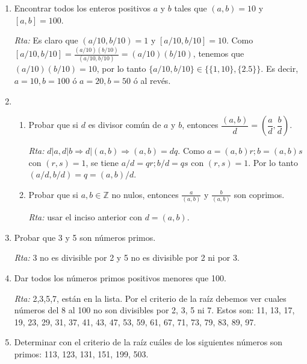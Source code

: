 \documentclass[a4paper,12pt,twoside,spanish,reqno]{amsbook}
\numberwithin{equation}{section}
\newcommand{\rta}{\noindent\textit{Rta: }}
\begin{document}
\begin{enumerate}
\begin{enumerate}
\end{enumerate}





\item Encontrar todos los enteros positivos $a$ y $b$ tales que $(a,b)=10$ y $[a,b]=100$.

\rta Es claro que $(a/10,b/10)=1$ y $[a/10,b/10] = 10$. Como $[a/10,b/10] = \displaystyle\frac{(a/10)(b/10)}{(a/10,b/10)}= (a/10)(b/10)$,  tenemos que $(a/10)(b/10) = 10$, por lo tanto $\{a/10,b/10\}\in \{\{1,10\},\{2.5\}\}$. Es decir, $a=10, b=100$ ó $a=20, b=50$ ó al revés.





\item
\begin{enumerate}
    \item Probar que si $d$ es divisor común de $a$ y $b$, entonces $\dfrac{(a,b)}{d} = \left(\dfrac{a}{d}, \dfrac{b}{d}\right)$.
    
     \rta  $d\vert a, d\vert b\Rightarrow d\vert(a,b)\Rightarrow (a,b)=dq$. Como $a=(a,b)r; b=(a, b)s$ con $(r, s)=1$, se tiene $a/d=qr; b/d=qs$ con $(r, s)=1$. Por lo tanto $(a/d, b/d)=q=(a,b)/d$.
    
    \item Probar que si $a,b\in \mathbb Z$ no nulos, entonces  $\displaystyle \frac a{(a,b)}$ y $\displaystyle \frac b{(a,b)}$ son coprimos.
    
     \rta  usar el inciso anterior con $d=(a,b)$.
\end{enumerate}



\item Probar que 3  y 5 son números primos.

 \rta  3 no es divisible por 2 y 5 no es divisible por 2 ni por 3.


\item  Dar todos los números primos positivos menores que 100.

\rta  2,3,5,7, están en la lista. Por  el criterio de la raíz debemos ver cuales números del  8 al 100 no son divisibles  por 2, 3, 5 ni 7. Estos son: 11, 13, 17, 19, 23, 29, 31, 37, 41, 43, 47, 53, 59, 61, 67, 71, 73, 79, 83, 89, 97.
 


\item Determinar con el criterio de la raíz cuáles de los siguientes números son primos: 113, 123, 131, 151, 199, 503.


\end{enumerate}
\end{document}
